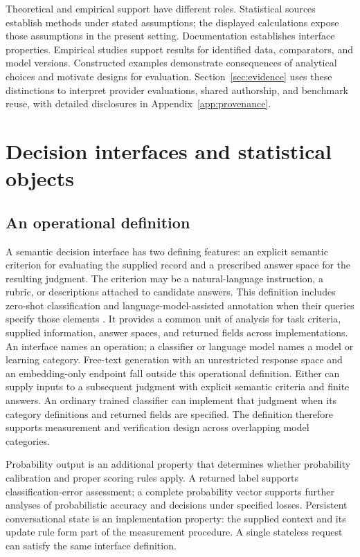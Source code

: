 \documentclass[11pt,a4paper]{article}
\begin{document}
Theoretical and empirical support have different roles. Statistical sources establish methods under stated assumptions; the displayed calculations expose those assumptions in the present setting. Documentation establishes interface properties. Empirical studies support results for identified data, comparators, and model versions. Constructed examples demonstrate consequences of analytical choices and motivate designs for evaluation. Section~\ref{sec:evidence} uses these distinctions to interpret provider evaluations, shared authorship, and benchmark reuse, with detailed disclosures in Appendix~\ref{app:provenance}.

\section{Decision interfaces and statistical objects}\label{sec:interface}

\subsection{An operational definition}\label{sec:definition}

A semantic decision interface has two defining features: an explicit semantic criterion for evaluating the supplied record and a prescribed answer space for the resulting judgment. The criterion may be a natural-language instruction, a rubric, or descriptions attached to candidate answers. This definition includes zero-shot classification and language-model-assisted annotation when their queries specify those elements \citep{yin2019,ziems2024}. It provides a common unit of analysis for task criteria, supplied information, answer spaces, and returned fields across implementations. An interface names an operation; a classifier or language model names a model or learning category. Free-text generation with an unrestricted response space and an embedding-only endpoint fall outside this operational definition. Either can supply inputs to a subsequent judgment with explicit semantic criteria and finite answers. An ordinary trained classifier can implement that judgment when its category definitions and returned fields are specified. The definition therefore supports measurement and verification design across overlapping model categories.

Probability output is an additional property that determines whether probability calibration and proper scoring rules apply. A returned label supports classification-error assessment; a complete probability vector supports further analyses of probabilistic accuracy and decisions under specified losses. Persistent conversational state is an implementation property: the supplied context and its update rule form part of the measurement procedure. A single stateless request can satisfy the same interface definition.
\end{document}
